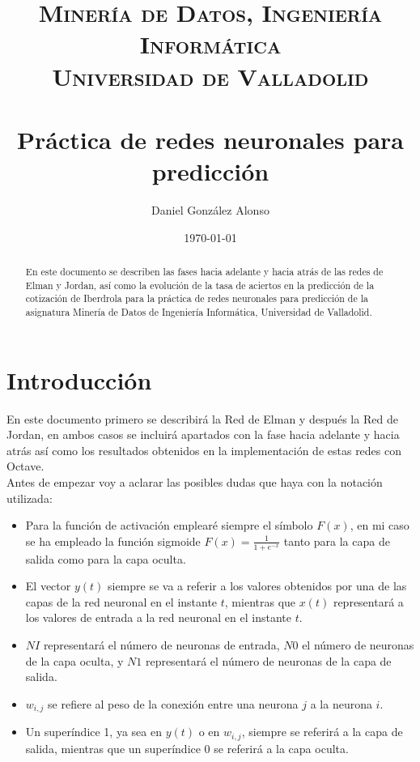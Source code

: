 \documentclass[a4paper,11pt]{article}
\title{
	\vspace{-25pt}
	\normalfont \Large \textsc{
		Minería de Datos, Ingeniería Informática\\
		Universidad de Valladolid
	}\\[10pt]
	\horrule{1pt}\\[10pt]
	\huge \textbf{
		Práctica de redes neuronales para predicción
	}\\
	\horrule{1pt}
}
\author{
	\normalfont \Large Daniel González Alonso
}
\date{
	\normalfont \large \today
}
\begin{document}
\maketitle

\begin{abstract}
	En este documento se describen las fases hacia adelante y hacia atrás de las redes de Elman y Jordan, así como la evolución de la tasa de aciertos en la predicción de la cotización de Iberdrola para la práctica de redes neuronales para predicción de la asignatura Minería de Datos de Ingeniería Informática, Universidad de Valladolid.
\end{abstract}

\section{Introducción}
En este documento primero se describirá la Red de Elman y después la Red de Jordan, en ambos casos se incluirá apartados con la fase hacia adelante y hacia atrás así como los resultados obtenidos en la implementación de estas redes con Octave.\\

Antes de empezar voy a aclarar las posibles dudas que haya con la notación utilizada:

\begin{itemize}
	\item Para la función de activación emplearé siempre el símbolo ${F(x)}$, en mi caso se ha empleado la función sigmoide ${F(x) = \frac{1}{1+e^{-x}}}$ tanto para la capa de salida como para la capa oculta.

	\item El vector ${y(t)}$ siempre se va a referir a los valores obtenidos por una de las capas de la red neuronal en el instante ${t}$, mientras que ${x(t)}$ representará a los valores de entrada a la red neuronal en el instante ${t}$.

	\item ${NI}$ representará el número de neuronas de entrada, ${N0}$ el número de neuronas de la capa oculta, y ${N1}$ representará el número de neuronas de la capa de salida.
    
    \item ${w_{i,j}}$ se refiere al peso de la conexión entre una neurona ${j}$ a la neurona ${i}$.

	\item Un superíndice 1, ya sea en ${y(t)}$ o en ${w_{i,j}}$, siempre se referirá a la capa de salida, mientras que un superíndice 0 se referirá a la capa oculta.
\end{itemize}
\end{document}

